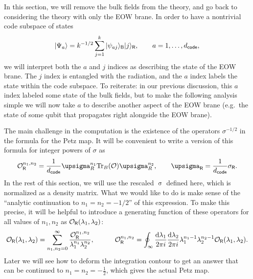 \documentclass[11pt]{article}
\newcommand{\be}{\begin{equation}}
\newcommand{\ee}{\end{equation}}
\numberwithin{equation}{section}
\def\tr{\text{Tr}}
\begin{document}
In this section, we will remove the bulk fields from the theory, and go back to considering the theory with only the EOW brane. In order to have a nontrivial code subspace of states
\be
|\Psi_a\rangle = k^{-1/2}\sum_{j = 1}^k|\psi_{aj}\rangle_{\sf{B}}|j\rangle_{\sf{R}}, \hspace{20pt} a = 1,\dots,d_{\sf{code}},
\ee
we will interpret both the $a$ and $j$ indices as describing the state of the EOW brane. The $j$ index is entangled with the radiation, and the $a$ index labels the state within the code subspace. To reiterate: in our previous discussion, this $a$ index labeled some state of the bulk fields, but to make the following analysis simple we will now take $a$ to describe another aspect of the EOW brane (e.g.~the state of some qubit that propagates right alongside the EOW brane).


The main challenge in the computation is the existence of the operators $\sigma^{-1/2}$ in the formula for the Petz map. It will be convenient to write a version of this formula for integer powers of $\sigma$ as
\be
\mathcal{O}_{\sf{R}}^{n_1,n_2}=\frac{1}{d_{\sf{code}}}\upsigma_R^{n_1}\tr_B (\mathcal{O}) \upsigma_R^{n_2}, \hspace{20pt} \upsigma_{\sf{R}} = \frac{1}{d_{\sf{code}}}\sigma_{\sf{R}}.
\ee
In the rest of this section, we will use the rescaled $\upsigma$ defined here, which is normalized as a density matrix. What we would like to do is make sense of the ``analytic continuation to $n_1 = n_2 = -1/2$'' of this expression. To make this precise, it will be helpful to introduce a generating function of these operators for all values of $n_1,n_2$ as $\mathcal{O}_{\sf{R}}(\lambda_1,\lambda_2)$:
\be
\mathcal{O}_{\sf{R}}(\lambda_1,\lambda_2)=\sum_{n_1,n_2 = 0}^\infty \frac{\mathcal{O}_{\sf{R}}^{n_1,n_2}}{\lambda_1^{n_1}\lambda_2^{n_2}}, \hspace{30pt} \mathcal{O}_{\sf{R}}^{n_1,n_2} = \oint_{\infty} \frac{\mathrm{d}\lambda_1}{2\pi i}\frac{\mathrm{d}\lambda_2}{2\pi i}\lambda_1^{n_1-1}\lambda_2^{n_2-1}\mathcal{O}_{\sf{R}}(\lambda_1,\lambda_2).\label{transform}
\ee
Later we will see how to deform the integration contour to get an answer that can be continued to $n_1 = n_2 = -\frac{1}{2}$, which gives the actual Petz map.
\end{document}
